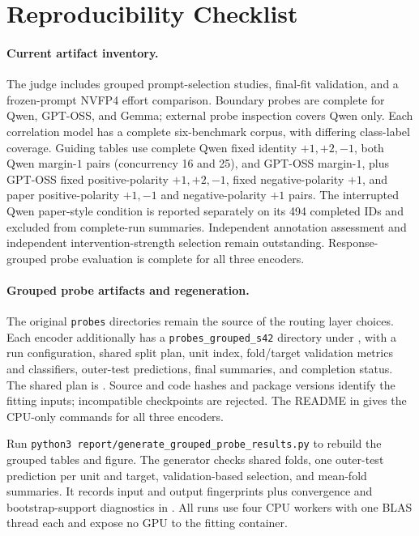 \appendix

\section{Reproducibility Checklist}

\paragraph{Current artifact inventory.}
The judge includes grouped prompt-selection studies, final-fit validation,
and a frozen-prompt NVFP4 effort comparison. Boundary probes are complete
for Qwen, GPT-OSS, and Gemma; external probe inspection covers Qwen only.
Each correlation model has a complete six-benchmark corpus, with differing
class-label coverage. Guiding tables use complete Qwen fixed identity
$+1,+2,-1$, both Qwen margin-$1$ pairs (concurrency 16 and 25),
and GPT-OSS margin-$1$, plus GPT-OSS fixed positive-polarity
$+1,+2,-1$, fixed negative-polarity $+1$, and paper positive-polarity
$+1,-1$ and negative-polarity $+1$ pairs. The interrupted Qwen paper-style condition is reported separately on its
494 completed IDs and excluded from complete-run summaries. Independent annotation assessment
and independent intervention-strength selection remain outstanding.
Response-grouped probe evaluation is complete for all three encoders.

\paragraph{Grouped probe artifacts and regeneration.}
The original \texttt{probes} directories remain the source of the routing
layer choices. Each encoder additionally has a \texttt{probes\_grouped\_s42}
directory under , with a run configuration, shared
split plan, unit index, fold/target validation metrics and classifiers,
outer-test predictions, final summaries, and completion status. The shared
plan is . Source and code
hashes and package versions identify the fitting inputs; incompatible
checkpoints are rejected. The README in  gives
the CPU-only commands for all three encoders.

Run \texttt{python3 report/generate\_grouped\_probe\_results.py} to rebuild
the grouped tables and figure. The generator checks shared folds, one
outer-test prediction per unit and target, validation-based selection, and
mean-fold summaries. It records input and output fingerprints plus
convergence and bootstrap-support diagnostics in
. All runs use four CPU workers
with one BLAS thread each and expose no GPU to the fitting container.

